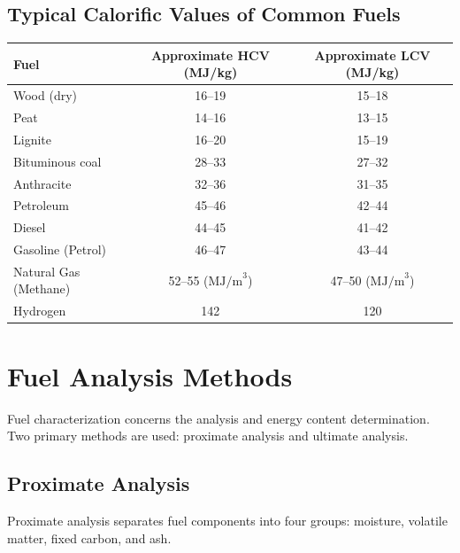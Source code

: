 \documentclass[12pt,a4paper]{article}
\begin{document}
\subsection{Typical Calorific Values of Common Fuels}
\begin{center}
\renewcommand{\arraystretch}{1.4}
\begin{tabular}{|l|c|c|}
\hline
\textbf{Fuel} & \textbf{Approximate HCV (MJ/kg)} & \textbf{Approximate LCV (MJ/kg)} \\
\hline
Wood (dry) & 16--19 & 15--18 \\
Peat & 14--16 & 13--15 \\
Lignite & 16--20 & 15--19 \\
Bituminous coal & 28--33 & 27--32 \\
Anthracite & 32--36 & 31--35 \\
Petroleum & 45--46 & 42--44 \\
Diesel & 44--45 & 41--42 \\
Gasoline (Petrol) & 46--47 & 43--44 \\
Natural Gas (Methane) & 52--55 ($\text{MJ/m}^3$) & 47--50 ($\text{MJ/m}^3$) \\
Hydrogen & 142 & 120 \\
\hline
\end{tabular}
\end{center}

\section{Fuel Analysis Methods}

Fuel characterization concerns the analysis and energy content determination. Two primary methods are used: proximate analysis and ultimate analysis.

\subsection{Proximate Analysis}
Proximate analysis separates fuel components into four groups: moisture, volatile matter, fixed carbon, and ash.
\end{document}
